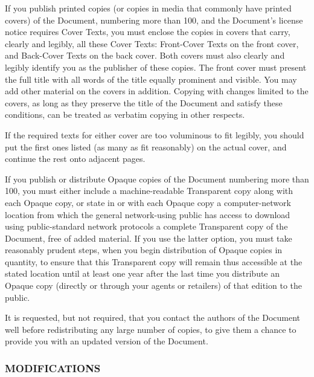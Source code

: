 \documentclass[10pt,english]{article}
\begin{document}
If you publish printed copies (or copies in media that commonly have
printed covers) of the Document, numbering more than 100, and the
Document's license notice requires Cover Texts, you must enclose the
copies in covers that carry, clearly and legibly, all these Cover
Texts: Front-Cover Texts on the front cover, and Back-Cover Texts
on the back cover. Both covers must also clearly and legibly identify
you as the publisher of these copies. The front cover must present
the full title with all words of the title equally prominent and visible.
You may add other material on the covers in addition. Copying with
changes limited to the covers, as long as they preserve the title
of the Document and satisfy these conditions, can be treated as verbatim
copying in other respects.

If the required texts for either cover are too voluminous to fit legibly,
you should put the first ones listed (as many as fit reasonably) on
the actual cover, and continue the rest onto adjacent pages.

If you publish or distribute Opaque copies of the Document numbering
more than 100, you must either include a machine-readable Transparent
copy along with each Opaque copy, or state in or with each Opaque
copy a computer-network location from which the general network-using
public has access to download using public-standard network protocols
a complete Transparent copy of the Document, free of added material.
If you use the latter option, you must take reasonably prudent steps,
when you begin distribution of Opaque copies in quantity, to ensure
that this Transparent copy will remain thus accessible at the stated
location until at least one year after the last time you distribute
an Opaque copy (directly or through your agents or retailers) of that
edition to the public.

It is requested, but not required, that you contact the authors of
the Document well before redistributing any large number of copies,
to give them a chance to provide you with an updated version of the
Document.


\subsubsection{MODIFICATIONS\label{sub:MODIFICATIONS}}
\end{document}
